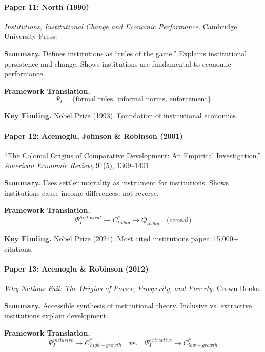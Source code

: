 \paragraph{Paper 11: North (1990)}

\textit{Institutions, Institutional Change and Economic Performance.}
Cambridge University Press.

\textbf{Summary.}
Defines institutions as ``rules of the game.'' Explains institutional persistence 
and change. Shows institutions are fundamental to economic performance.

\textbf{Framework Translation.}
\begin{equation}
\Psi_I = \{\text{formal rules, informal norms, enforcement}\}
\end{equation}

\textbf{Key Finding.}
Nobel Prize (1993). Foundation of institutional economics.

\paragraph{Paper 12: Acemoglu, Johnson \& Robinson (2001)}

``The Colonial Origins of Comparative Development: An Empirical Investigation.''
\textit{American Economic Review}, 91(5), 1369--1401.

\textbf{Summary.}
Uses settler mortality as instrument for institutions. Shows institutions 
cause income differences, not reverse.

\textbf{Framework Translation.}
\begin{equation}
\Psi_I^{historical} \to C^*_{today} \to Q_{today} \quad \text{(causal)}
\end{equation}

\textbf{Key Finding.}
Nobel Prize (2024). Most cited institutions paper. 15,000+ citations.

\paragraph{Paper 13: Acemoglu \& Robinson (2012)}

\textit{Why Nations Fail: The Origins of Power, Prosperity, and Poverty.}
Crown Books.

\textbf{Summary.}
Accessible synthesis of institutional theory. Inclusive vs. extractive 
institutions explain development.

\textbf{Framework Translation.}
\begin{equation}
\Psi_I^{inclusive} \to C^*_{high-growth} \quad \text{vs.} \quad 
\Psi_I^{extractive} \to C^*_{low-growth}
\end{equation}

